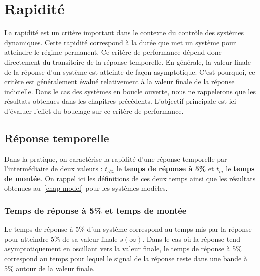 \section{Rapidité}
La rapidité est un critère important dans le contexte du contrôle des 
systèmes dynamiques. Cette rapidité correspond à la durée que met un 
système pour atteindre le régime permanent. Ce critère de performance 
dépend donc directement du transitoire de la réponse temporelle. 
En générale, la valeur finale de la réponse d'un système est atteinte de 
façon asymptotique. C'est pourquoi, ce critère est généralement évalué 
relativement à la valeur finale de la réponse indicielle. 
Dans le cas des systèmes en boucle ouverte, nous ne rappelerons que les 
résultats obtenues dans les chapitres précédents. 
L'objectif principale est ici d'évaluer l'effet du bouclage sur ce critère 
de performance.

\subsection{Réponse temporelle}
Dans la pratique, on caractérise la rapidité d'une réponse temporelle par 
l'intermédiaire de deux valeurs : $t_{5\%}$ le \textbf{temps de réponse à 5\%}
et $t_m$ le \textbf{temps de montée}. 
On rappel ici les définitions de ces deux temps ainsi que 
les résultats obtenues au~\cref{chap-model} pour les systèmes modèles.

\subsubsection{Temps de réponse à 5\% et temps de montée}

Le temps de réponse à 5\% d'un système correspond au temps mis par la réponse 
pour atteindre 5\% de sa valeur finale $s(\infty)$. Dans le cas où la réponse 
tend asymptotiquement en oscillant vers la valeur finale, le temps de
réponse à 5\% correspond au temps pour lequel le signal de la réponse reste
dans une bande à 5\% autour de la valeur finale. 

